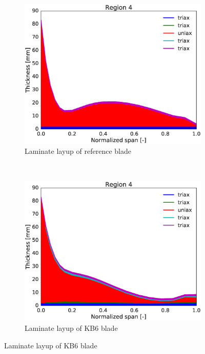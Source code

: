 \begin{figure}[tph]
\begin{subfigure}{0.50\textwidth}
\includegraphics[width=\linewidth]{figures/KB6_final/baseline_laminate_layers_r04.eps}
\caption{Laminate layup of reference blade}
\label{subfig:baseline_layers_r04}
\end{subfigure}
 ~
\begin{subfigure}{0.50\textwidth}
\includegraphics[width=\linewidth]{figures/KB6_final/KB6_laminate_layers_r04.eps}
\caption{Laminate layup of KB6 blade}
\label{subfig:KB6_layers_r04}
\end{subfigure}


\end{figure}
